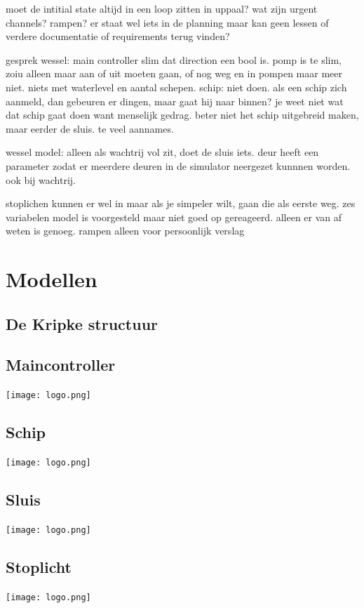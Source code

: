 \documentclass{article}
\begin{document}
	moet de intitial state altijd in een loop zitten in uppaal?
	wat zijn urgent channels?
	rampen? er staat wel iets in de planning maar kan geen lessen of verdere documentatie of requirements terug vinden?	
	
	
	gesprek wessel:
	main controller slim dat direction een bool is. 
	pomp is te slim, zoiu alleen maar aan of uit moeten gaan, of nog weg en in pompen maar meer niet. niets met waterlevel en aantal schepen.
	schip: niet doen. als een schip zich aanmeld, dan gebeuren er dingen, maar gaat hij naar binnen? je weet niet wat dat schip gaat doen want menselijk gedrag. beter niet het schip uitgebreid maken, maar eerder de sluis. te veel aannames.
	
	wessel model: alleen als wachtrij vol zit, doet de sluis iets.
	deur heeft een parameter zodat er meerdere deuren in de simulator neergezet kunnnen worden. ook bij wachtrij.
	
	stoplichen kunnen er wel in maar als je simpeler wilt, gaan die als eerste weg.
	zes variabelen model is voorgesteld maar niet goed op gereageerd. alleen er van af weten is genoeg.
	rampen alleen voor persoonlijk verslag
	
	
	
	\section{Modellen}
	
	\subsection{De Kripke structuur}
	
	\subsection{Maincontroller}
	\texttt{[image: logo.png]} %
	\subsection{Schip}
	\texttt{[image: logo.png]} %
	\subsection{Sluis}
	\texttt{[image: logo.png]} %
	\subsection{Stoplicht}
		\texttt{[image: logo.png]} %
\end{document}
